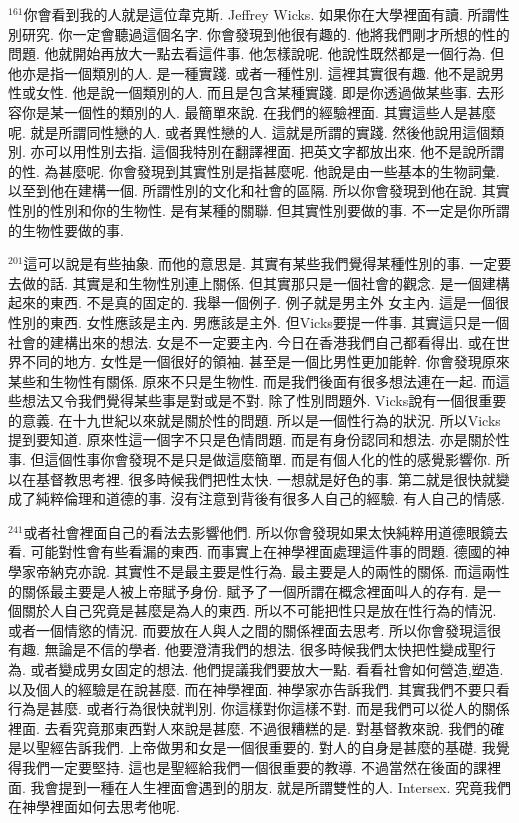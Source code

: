 \documentclass{book}
\begin{document}
$^{161}$你會看到我的人就是這位韋克斯.
Jeffrey Wicks.
如果你在大學裡面有讀.
所謂性別研究.
你一定會聽過這個名字.
你會發現到他很有趣的.
他將我們剛才所想的性的問題.
他就開始再放大一點去看這件事.
他怎樣說呢.
他說性既然都是一個行為.
但他亦是指一個類別的人.
是一種實踐.
或者一種性別.
這裡其實很有趣.
他不是說男性或女性.
他是說一個類別的人.
而且是包含某種實踐.
即是你透過做某些事.
去形容你是某一個性的類別的人.
最簡單來說.
在我們的經驗裡面.
其實這些人是甚麼呢.
就是所謂同性戀的人.
或者異性戀的人.
這就是所謂的實踐.
然後他說用這個類別.
亦可以用性別去指.
這個我特別在翻譯裡面.
把英文字都放出來.
他不是說所謂的性.
為甚麼呢.
你會發現到其實性別是指甚麼呢.
他說是由一些基本的生物詞彙.
以至到他在建構一個.
所謂性別的文化和社會的區隔.
所以你會發現到他在說.
其實性別的性別和你的生物性.
是有某種的關聯.
但其實性別要做的事.
不一定是你所謂的生物性要做的事.

$^{201}$這可以說是有些抽象.
而他的意思是.
其實有某些我們覺得某種性別的事.
一定要去做的話.
其實是和生物性別連上關係.
但其實那只是一個社會的觀念.
是一個建構起來的東西.
不是真的固定的.
我舉一個例子.
例子就是男主外 女主內.
這是一個很性別的東西.
女性應該是主內.
男應該是主外.
但Vicks要提一件事.
其實這只是一個社會的建構出來的想法.
女是不一定要主內.
今日在香港我們自己都看得出.
或在世界不同的地方.
女性是一個很好的領袖.
甚至是一個比男性更加能幹.
你會發現原來某些和生物性有關係.
原來不只是生物性.
而是我們後面有很多想法連在一起.
而這些想法又令我們覺得某些事是對或是不對.
除了性別問題外.
Vicks說有一個很重要的意義.
在十九世紀以來就是關於性的問題.
所以是一個性行為的狀況.
所以Vicks提到要知道.
原來性這一個字不只是色情問題.
而是有身份認同和想法.
亦是關於性事.
但這個性事你會發現不是只是做這麼簡單.
而是有個人化的性的感覺影響你.
所以在基督教思考裡.
很多時候我們把性太快.
一想就是好色的事.
第二就是很快就變成了純粹倫理和道德的事.
沒有注意到背後有很多人自己的經驗.
有人自己的情感.

$^{241}$或者社會裡面自己的看法去影響他們.
所以你會發現如果太快純粹用道德眼鏡去看.
可能對性會有些看漏的東西.
而事實上在神學裡面處理這件事的問題.
德國的神學家帝納克亦說.
其實性不是最主要是性行為.
最主要是人的兩性的關係.
而這兩性的關係最主要是人被上帝賦予身份.
賦予了一個所謂在概念裡面叫人的存有.
是一個關於人自己究竟是甚麼是為人的東西.
所以不可能把性只是放在性行為的情況.
或者一個情慾的情況.
而要放在人與人之間的關係裡面去思考.
所以你會發現這很有趣.
無論是不信的學者.
他要澄清我們的想法.
很多時候我們太快把性變成聖行為.
或者變成男女固定的想法.
他們提議我們要放大一點.
看看社會如何營造,塑造.
以及個人的經驗是在說甚麼.
而在神學裡面.
神學家亦告訴我們.
其實我們不要只看行為是甚麼.
或者行為很快就判別.
你這樣對你這樣不對.
而是我們可以從人的關係裡面.
去看究竟那東西對人來說是甚麼.
不過很糟糕的是.
對基督教來說.
我們的確是以聖經告訴我們.
上帝做男和女是一個很重要的.
對人的自身是甚麼的基礎.
我覺得我們一定要堅持.
這也是聖經給我們一個很重要的教導.
不過當然在後面的課裡面.
我會提到一種在人生裡面會遇到的朋友.
就是所謂雙性的人.
Intersex.
究竟我們在神學裡面如何去思考他呢.
\end{document}
